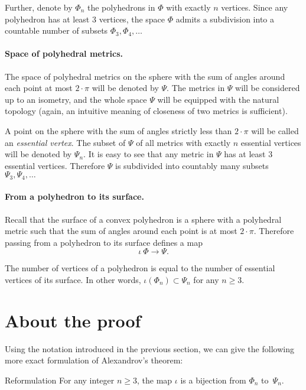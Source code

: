 Further, denote by $\Phi_n$ the polyhedrons in $\Phi$ with exactly $n$ vertices.
Since any polyhedron has at least 3 vertices, the space $\Phi$ admits a subdivision into a countable number of subsets $\Phi_3,\Phi_4,\dots$

\paragraph{Space of polyhedral metrics.}
The space of polyhedral metrics on the sphere with the sum of angles around each point at most $2\cdot\pi$ will be denoted by $\Psi$.
The metrics in $\Psi$ will be considered up to an isometry, and the whole space $\Psi$ will be equipped with the natural topology (again, an intuitive meaning of closeness of two metrics is sufficient).

A point on the sphere with the sum of angles strictly less than $2\cdot\pi$ will be called an \emph{essential vertex}.
The subset of $\Psi$ of all metrics with exactly $n$ essential vertices will be denoted by $\Psi_n$.
It is easy to see that any metric in $\Psi$ has at least 3 essential vertices.
Therefore $\Psi$ is subdivided into countably many subsets
 $\Psi_3,\Psi_4,\dots$

\paragraph{From a polyhedron to its surface.}

Recall that the surface of a convex polyhedron is a sphere with a polyhedral metric such that the sum of angles around each point is at most $2\cdot\pi$.
Therefore passing from a polyhedron to its surface defines a map
\[\iota\:\Phi\to \Psi.\]

The number of vertices of a polyhedron is equal to the number of essential vertices of its surface.
In other words, $\iota(\Phi_n)\subset \Psi_n$ for any $n\ge 3$.

\section{About the proof}

Using the notation introduced in the previous section, we can give the following more exact formulation of Alexandrov's theorem: 

\begin{thm}{Reformulation}
For any integer $n\ge 3$,
the map $\iota$ is a bijection from $\Phi_n$ to~$\Psi_n$.
\end{thm}

